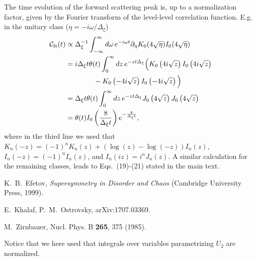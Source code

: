 \documentclass[twocolumn,showpacs,aps,prl]{revtex4}
\begin{document}
The time evolution of the forward scattering peak is, up to a normalization factor, 
given by the Fourier transform of the level-level correlation function. 
E.g. 
in the unitary class ($\eta=-i\omega/\Delta_\xi$)
\begin{align}
{\cal C}_{\rm fs}(t)
&
\propto
 \Delta_\xi^{-1} \int_{-\infty}^\infty d\omega\, e^{-i\omega t}
\partial_\eta K_0(4\sqrt{\eta})  I_0(4\sqrt{\eta})
\nonumber \\
&=
i\Delta_\xi t \theta(t)
\int_{0}^\infty dz
\, e^{-z t\Delta_\xi}
\Big(
K_0\left(4i\sqrt{z}\right)  
I_0\left(4i\sqrt{z}\right)
\nonumber\\
&\qquad \qquad 
-
K_0\left(-4i\sqrt{z}\right)  
I_0\left(-4i\sqrt{z}\right)
\Big)
\nonumber \\
&=
\Delta_\xi t  \theta(t)
\int_{0}^\infty dz
\, e^{-z t\Delta_\xi}
J_0\left(4\sqrt{z}\right)  
J_0\left(4\sqrt{z}\right)
\nonumber \\
&=
\theta(t)
 I_0\left( {8\over \Delta_\xi t} \right)
e^{-{8\over \Delta_\xi t}},
\end{align}
where in the third line we used that 
$K_n(-z)
=(-1)^nK_n(z)+\left( \log(z) - \log(-z) \right) I_n(z)$, 
$I_n(-z)
=(-1)^nI_n(z)$, and $I_n(iz)=i^nJ_n(z)$. 
A similar calculation for the remaining classes, 
leads to Eqs.~(19)-(21) stated in the main text.





\begin{thebibliography}{99}

K.~B.~Efetov, \textit{Supersymmetry in Disorder and Chaos} (Cambridge University Press, 1999). 

E.~Khalaf, P.~M.~Ostrovsky, arXiv:1707.03369.

M.~Zirnbauer, Nucl. Phys. B {\bf 265}, 375 (1985).

Notice that we here used that integrals over 
variables parametrizing $U_2$ are normalized.

\end{thebibliography}
\end{document}
